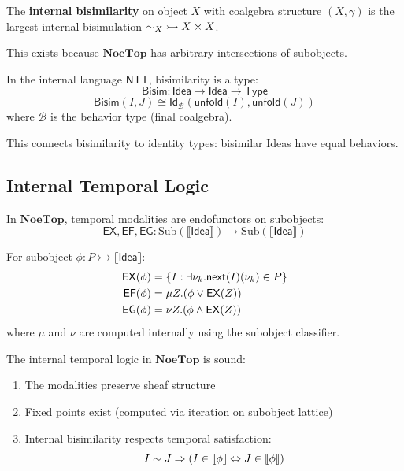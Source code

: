 \begin{proposition}
\label{prop:internal-bisimilarity}
The \textbf{internal bisimilarity} on object $X$ with coalgebra structure $(X, \gamma)$
is the largest internal bisimulation ${\sim_X} \rightarrowtail X \times X$.

This exists because $\mathbf{NoeTop}$ has arbitrary intersections of subobjects.
\end{proposition}

\begin{definition}
\label{def:bisimilarity-type}
In the internal language $\mathsf{NTT}$, bisimilarity is a type:
\[
  \mathsf{Bisim} : \mathsf{Idea} \to \mathsf{Idea} \to \mathsf{Type}
\]
\[
  \mathsf{Bisim}(I, J) \cong \mathsf{Id}_{\mathcal{B}}(\mathsf{unfold}(I), \mathsf{unfold}(J))
\]
where $\mathcal{B}$ is the behavior type (final coalgebra).

This connects bisimilarity to identity types: bisimilar Ideas have equal behaviors.
\end{definition}

\subsection{Internal Temporal Logic}
\label{subsec:internal-temporal}

\begin{definition}
\label{def:internal-temporal-modalities}
In $\mathbf{NoeTop}$, temporal modalities are endofunctors on subobjects:
\[
  \mathsf{EX}, \mathsf{EF}, \mathsf{EG} : \mathrm{Sub}(\llbracket \mathsf{Idea} \rrbracket) \to \mathrm{Sub}(\llbracket \mathsf{Idea} \rrbracket)
\]

For subobject $\phi : P \rightarrowtail \llbracket \mathsf{Idea} \rrbracket$:
\begin{align*}
  \mathsf{EX}(\phi) &= \{I : \exists \nu_{k}. \mathsf{next}(I)(\nu_{k}) \in P\} \\
  \mathsf{EF}(\phi) &= \mu Z. (\phi \lor \mathsf{EX}(Z)) \\
  \mathsf{EG}(\phi) &= \nu Z. (\phi \land \mathsf{EX}(Z))
\end{align*}
where $\mu$ and $\nu$ are computed internally using the subobject classifier.
\end{definition}

\begin{theorem}
\label{thm:internal-temporal-soundness}
The internal temporal logic in $\mathbf{NoeTop}$ is sound:
\begin{enumerate}[label=(\alph*)]
  \item The modalities preserve sheaf structure
  \item Fixed points exist (computed via iteration on subobject lattice)
  \item Internal bisimilarity respects temporal satisfaction:
        \[
          I \sim J \Rightarrow (I \in \llbracket \phi \rrbracket \Leftrightarrow J \in \llbracket \phi \rrbracket)
        \]
\end{enumerate}
\end{theorem}

